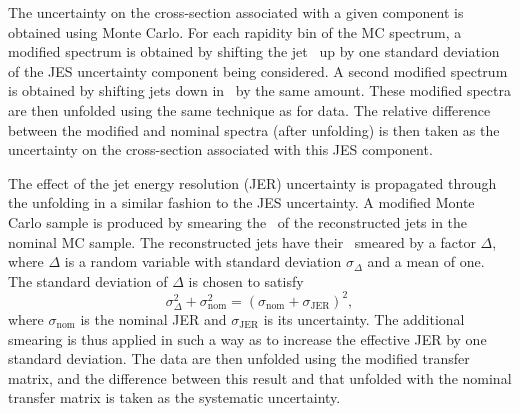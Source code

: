 The uncertainty  on the cross-section associated with a given component is obtained using Monte Carlo. For each rapidity bin of the MC spectrum, a modified spectrum is obtained by shifting the jet \pt~up by one standard deviation of the JES uncertainty component being considered. A second modified spectrum is obtained by shifting jets down in \pt~by the same amount. These modified spectra are then unfolded using the same technique as for data. The relative difference between the modified and nominal spectra (after unfolding) is then taken as the uncertainty on the cross-section associated with this JES component.
%
%
%
%
%
%
%
%
%
%
%
%
%

The effect of the jet energy resolution (JER) uncertainty is propagated through the unfolding in a similar fashion to the JES uncertainty. A modified Monte Carlo sample is produced by smearing the \pt~of the reconstructed jets in the nominal MC sample. The reconstructed jets have their \pt~smeared by a factor $\Delta$, where $\Delta$ is a random variable with standard deviation $\sigma_\Delta$ and a mean of one. The standard deviation of $\Delta$ is chosen to satisfy
\begin{equation}
 \sigma_\Delta^2 + \sigma_{\mathrm{nom}}^2 = \left ( \sigma_{\mathrm{nom}}  + \sigma_\mathrm{JER} \right )^2,
 \end{equation}
where $\sigma_{\mathrm{nom}}$ is the nominal JER and $\sigma_\mathrm{JER}$ is its uncertainty. The additional smearing is thus applied in such a way as to increase the effective JER by one standard deviation. The data are then unfolded using the modified transfer matrix, and the difference between this result and that unfolded with the nominal transfer matrix is taken as the systematic uncertainty. 

